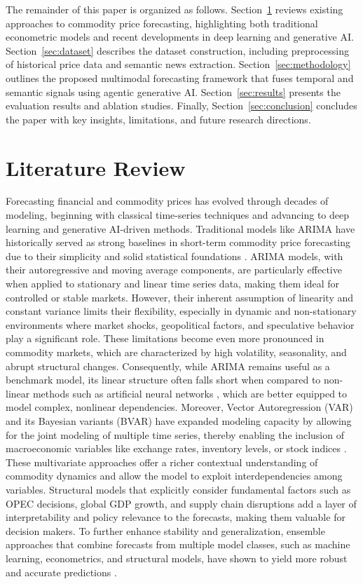 \documentclass[12pt]{elsarticle}
\begin{document}
The remainder of this paper is organized as follows. Section~\ref{sec:literature} reviews existing approaches to commodity price forecasting, highlighting both traditional econometric models and recent developments in deep learning and generative AI. Section~\ref{sec:dataset} describes the dataset construction, including preprocessing of historical price data and semantic news extraction. Section~\ref{sec:methodology} outlines the proposed multimodal forecasting framework that fuses temporal and semantic signals using agentic generative AI. Section~\ref{sec:results} presents the evaluation results and ablation studies. Finally, Section~\ref{sec:conclusion} concludes the paper with key insights, limitations, and future research directions.

\section{Literature Review}
\label{sec:literature}
Forecasting financial and commodity prices has evolved through decades of modeling, beginning with classical time-series techniques and advancing to deep learning and generative AI-driven methods. Traditional models like ARIMA have historically served as strong baselines in short-term commodity price forecasting due to their simplicity and solid statistical foundations \cite{Behmiri2013}. ARIMA models, with their autoregressive and moving average components, are particularly effective when applied to stationary and linear time series data, making them ideal for controlled or stable markets. However, their inherent assumption of linearity and constant variance limits their flexibility, especially in dynamic and non-stationary environments where market shocks, geopolitical factors, and speculative behavior play a significant role. These limitations become even more pronounced in commodity markets, which are characterized by high volatility, seasonality, and abrupt structural changes. Consequently, while ARIMA remains useful as a benchmark model, its linear structure often falls short when compared to non-linear methods such as artificial neural networks \cite{Lasheras2015}, which are better equipped to model complex, nonlinear dependencies. Moreover, Vector Autoregression (VAR) and its Bayesian variants (BVAR) have expanded modeling capacity by allowing for the joint modeling of multiple time series, thereby enabling the inclusion of macroeconomic variables like exchange rates, inventory levels, or stock indices \cite{Kwas2021}. These multivariate approaches offer a richer contextual understanding of commodity dynamics and allow the model to exploit interdependencies among variables. Structural models that explicitly consider fundamental factors such as OPEC decisions, global GDP growth, and supply chain disruptions add a layer of interpretability and policy relevance to the forecasts, making them valuable for decision makers. To further enhance stability and generalization, ensemble approaches that combine forecasts from multiple model classes, such as machine learning, econometrics, and structural models, have shown to yield more robust and accurate predictions \cite{Baumeister2015}.
\end{document}
